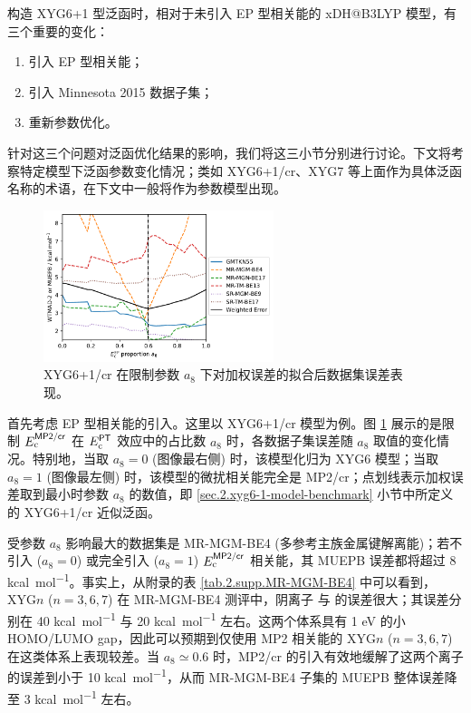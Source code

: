 构造 XYG6+1 型泛函时，相对于未引入 EP 型相关能的 xDH@B3LYP 模型，有三个重要的变化：
\begin{enumerate}[nosep]
  \item 引入 EP 型相关能；
  \item 引入 Minnesota 2015 数据子集；
  \item 重新参数优化。
\end{enumerate}
针对这三个问题对泛函优化结果的影响，我们将这三小节分别进行讨论。下文将考察特定模型下泛函参数变化情况；类如 XYG6+1/cr、XYG7 等上面作为具体泛函名称的术语，在下文中一般将作为参数模型出现。

\begin{figure}[h]
  \centering
  \includegraphics[width=0.6\textwidth]{assets/plot-seq-cr-proportion.pdf}
  \caption[XYG6+1/cr 在限制参数 $E_\mathrm{c}^\textmt{EP}$ 占比系数下的参数优化误差表现]{XYG6+1/cr 在限制参数 $a_8$ 下对加权误差的拟合后数据集误差表现。}
  \label{fig.2.plot-seq-cr-proportion}
\end{figure}

首先考虑 EP 型相关能的引入。这里以 XYG6+1/cr 模型为例。图 \ref{fig.2.plot-seq-cr-proportion} 展示的是限制 $E_\mathrm{c}^{\textsf{MP2/cr}}$ 在 $E_\mathrm{c}^{\textsf{PT}}$ 效应中的占比数 $a_8$ 时，各数据子集误差随 $a_8$ 取值的变化情况。特别地，当取 $a_8 = 0$ (图像最右侧) 时，该模型化归为 XYG6 模型；当取 $a_8 = 1$ (图像最左侧) 时，该模型的微扰相关能完全是 MP2/cr；点划线表示加权误差取到最小时参数 $a_8$ 的数值，即 \ref{sec.2.xyg6-1-model-benchmark} 小节中所定义的 XYG6+1/cr 近似泛函。

受参数 $a_8$ 影响最大的数据集是 MR-MGM-BE4 (多参考主族金属键解离能)；若不引入 ($a_8 = 0$) 或完全引入 ($a_8 = 1$) $E_\mathrm{c}^{\textsf{MP2/cr}}$ 相关能，其 MUEPB 误差都将超过 8 \si{kcal.mol^{-1}}。事实上，从附录的表 \ref{tab.2.supp.MR-MGM-BE4} 中可以看到，XYG$n$ ($n=3,6,7$) 在 MR-MGM-BE4 测评中，阴离子  与  的误差很大；其误差分别在 40 \si{kcal.mol^{-1}} 与 20 \si{kcal.mol^{-1}} 左右。这两个体系具有 1 eV 的小 HOMO/LUMO gap，因此可以预期到仅使用 MP2 相关能的 XYG$n$ ($n=3,6,7$) 在这类体系上表现较差。当 $a_8 \simeq 0.6$ 时，MP2/cr 的引入有效地缓解了这两个离子的误差到小于 10 \si{kcal.mol^{-1}}，从而 MR-MGM-BE4 子集的 MUEPB 整体误差降至 3 \si{kcal.mol^{-1}} 左右。

